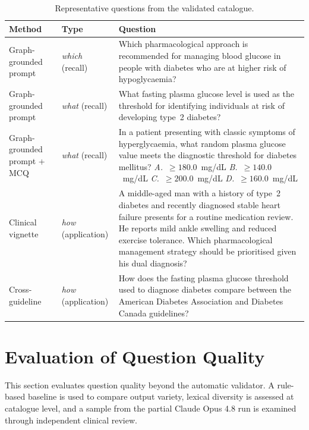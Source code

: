 \begin{table}[!ht]
\centering
\small\setlength{\tabcolsep}{6pt}
\begin{tabular}{p{2.4cm} p{2.8cm} p{8.0cm}}
\hline
\textbf{Method} & \textbf{Type} & \textbf{Question} \\
\hline
Graph-grounded prompt
  & \textit{which} (recall)
  & Which pharmacological approach is recommended for managing blood
    glucose in people with diabetes who are at higher risk of
    hypoglycaemia? \\[6pt]
Graph-grounded prompt
  & \textit{what} (recall)
  & What fasting plasma glucose level is used as the threshold for
    identifying individuals at risk of developing type~2 diabetes? \\[6pt]
Graph-grounded prompt + MCQ
  & \textit{what} (recall)
  & In a patient presenting with classic symptoms of hyperglycaemia,
    what random plasma glucose value meets the diagnostic threshold
    for diabetes mellitus?
    \newline
    \textit{A.}~$\geq 180.0$~mg/dL \quad
    \textit{B.}~$\geq 140.0$~mg/dL \quad
    \textit{C.}~$\geq 200.0$~mg/dL \quad
    \textit{D.}~$\geq 160.0$~mg/dL \\[6pt]
Clinical vignette
  & \textit{how} (application)
  & A middle-aged man with a history of type~2 diabetes and recently
    diagnosed stable heart failure presents for a routine medication
    review. He reports mild ankle swelling and reduced exercise
    tolerance. Which pharmacological management strategy should be
    prioritised given his dual diagnosis? \\[6pt]
Cross-guideline
  & \textit{how} (application)
  & How does the fasting plasma glucose threshold used to diagnose
    diabetes compare between the American Diabetes Association and
    Diabetes Canada guidelines? \\
\hline
\end{tabular}
\caption{Representative questions from the validated catalogue.}
\label{tab:q-examples}
\end{table}

\section{Evaluation of Question Quality}
\label{sec:exp_quality}

This section evaluates question quality beyond the automatic validator. A rule-based baseline is used to compare output variety, lexical diversity is assessed at catalogue level, and a sample from the partial Claude Opus 4.8 run is examined through independent clinical review.

